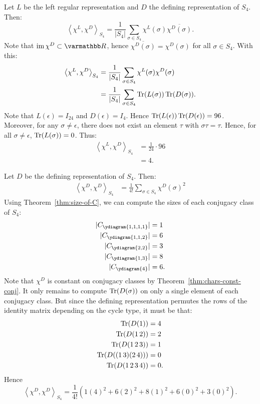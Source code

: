 \begin{example}
	Let $L$ be the left regular representation and $D$ the defining representation of $S_4$. Then:
	\[
		\left<\chi^L ,\chi^D\right>_{S_4} = \frac{1}{|S_4|}\sum_{\sigma \in S_4}^{} \chi^L(\sigma)\overline{\chi^D(\sigma)}.
	\] 
	Note that $\Image \chi^D \subset \bfR$, hence $\overline{\chi^D(\sigma)} = \chi^D(\sigma)$ for all $\sigma \in S_4$. With this:
	\begin{align*}
		\left<\chi^L,\chi^D \right>_{S_4}
		&= \frac{1}{|S_4|}\sum_{\sigma \in S_4}^{} \chi^L(\sigma)\chi^D(\sigma) \\
		&= \frac{1}{|S_4|}\sum_{\sigma \in S_4}^{} \operatorname{Tr}(L(\sigma))\operatorname{Tr}(D(\sigma)).
	\end{align*}
	Note that $L(\epsilon) = I_{24}$ and $D(\epsilon) = I_4$. Hence $\operatorname{Tr}(L(\epsilon))\operatorname{Tr}(D(\epsilon)) = 96$. Moreover, for any $\sigma \neq \epsilon$, there does not exist an element $\tau$ with $\sigma \tau = \tau$. Hence, for all $\sigma \neq \epsilon$, $\operatorname{Tr}(L(\sigma)) = 0$. Thus:
	\begin{align*}
		\left<\chi^L,\chi^D \right>_{S_4}
		&= \frac{1}{24}\cdot96 \\
		&= 4.
	\end{align*}
\end{example}

\begin{example}
	Let $D$ be the defining representation of $S_4$. Then:
	\begin{align*}
		\left<\chi^D,\chi^D \right>_{S_4}
		&= \frac{1}{4!} \sum_{\sigma \in S_4}^{} \chi^D(\sigma)^2
	\end{align*}
	Using Theorem~\ref{thm:size-of-C}, we can compute the sizes of each conjugacy class of $S_4$:
	\begingroup
	\begin{align*}
		|C_{\ydiagram{1,1,1,1}}| &= 1 \\
		|C_{\ydiagram{1,1,2}}| &= 6 \\
		|C_{\ydiagram{2,2}}| &= 3 \\
		|C_{\ydiagram{1,3}}| &= 8 \\
		|C_{\ydiagram{4}}| &= 6.
	\end{align*}
	\endgroup
	Note that $\chi^D$ is constant on conjugacy classes by Theorem~\ref{thm:chars-const-conj}. It only remains to compute $\operatorname{Tr}(D(\sigma))$ on only a single element of each conjugacy class. But since the defining representation permutes the rows of the identity matrix depending on the cycle type, it must be that:
	\begin{align*}
		\operatorname{Tr}(D(1)) & = 4 \\
		\operatorname{Tr}(D(1\,2)) & = 2 \\
		\operatorname{Tr}(D(1\,2\,3)) & = 1 \\
		\operatorname{Tr}(D((1\,3)(2\,4))) &= 0 \\
		\operatorname{Tr}(D(1\,2\,3\,4)) &= 0.
	\end{align*}
	Hence $$\left<\chi^D,\chi^D \right>_{S_4} = \frac{1}{4!}(1(4)^2 + 6(2)^2 + 8(1)^2 + 6(0)^2 + 3(0)^2).$$

\end{example}

